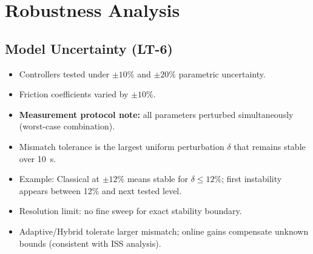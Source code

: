 \documentclass[10pt, a4paper]{article}
\begin{document}
\section{Robustness Analysis}

\subsection{Model Uncertainty (LT-6)}

\begin{itemize}[leftmargin=1.5em,itemsep=0.2em]
  \item Controllers tested under $\pm10\%$ and $\pm20\%$ parametric uncertainty.
  \item Friction coefficients varied by $\pm10\%$.
  \item \textbf{Measurement protocol note:}
  all parameters perturbed simultaneously (worst-case combination).
  \item Mismatch tolerance is the largest uniform perturbation $\delta$
  that remains stable over 10~s.
  \item Example: Classical at $\pm12\%$ means stable for $\delta\le12\%$;
  first instability appears between 12\% and next tested level.
  \item Resolution limit: no fine sweep for exact stability boundary.
\end{itemize}

\begin{center}
\end{center}

\begin{itemize}[leftmargin=1.5em,itemsep=0.2em]
  \item Adaptive/Hybrid tolerate larger mismatch; online gains compensate unknown bounds
  (consistent with ISS analysis).
\end{itemize}
\end{document}
